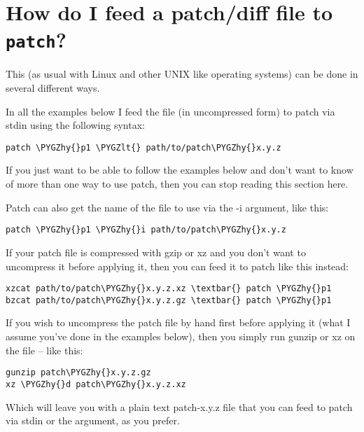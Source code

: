 \documentclass[a4paper,8pt,english]{sphinxmanual}
\def\PYGZlt{\char`\<}
\def\PYGZhy{\char`\-}
\begin{document}
\section{How do I feed a patch/diff file to \texttt{patch}?}
\label{process/applying-patches:how-do-i-feed-a-patch-diff-file-to-patch}
This (as usual with Linux and other UNIX like operating systems) can be
done in several different ways.

In all the examples below I feed the file (in uncompressed form) to patch
via stdin using the following syntax:

\begin{Verbatim}[commandchars=\\\{\}]
patch \PYGZhy{}p1 \PYGZlt{} path/to/patch\PYGZhy{}x.y.z
\end{Verbatim}

If you just want to be able to follow the examples below and don't want to
know of more than one way to use patch, then you can stop reading this
section here.

Patch can also get the name of the file to use via the -i argument, like
this:

\begin{Verbatim}[commandchars=\\\{\}]
patch \PYGZhy{}p1 \PYGZhy{}i path/to/patch\PYGZhy{}x.y.z
\end{Verbatim}

If your patch file is compressed with gzip or xz and you don't want to
uncompress it before applying it, then you can feed it to patch like this
instead:

\begin{Verbatim}[commandchars=\\\{\}]
xzcat path/to/patch\PYGZhy{}x.y.z.xz \textbar{} patch \PYGZhy{}p1
bzcat path/to/patch\PYGZhy{}x.y.z.gz \textbar{} patch \PYGZhy{}p1
\end{Verbatim}

If you wish to uncompress the patch file by hand first before applying it
(what I assume you've done in the examples below), then you simply run
gunzip or xz on the file -- like this:

\begin{Verbatim}[commandchars=\\\{\}]
gunzip patch\PYGZhy{}x.y.z.gz
xz \PYGZhy{}d patch\PYGZhy{}x.y.z.xz
\end{Verbatim}

Which will leave you with a plain text patch-x.y.z file that you can feed to
patch via stdin or the  argument, as you prefer.
\end{document}
